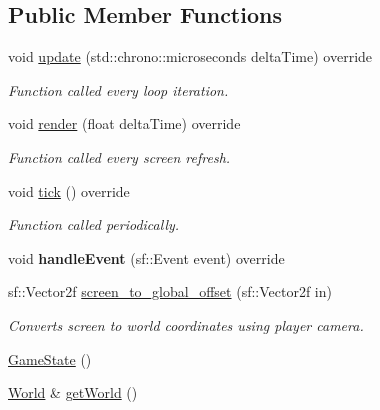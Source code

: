 \subsection*{Public Member Functions}
\begin{DoxyCompactItemize}
\item 
void \hyperlink{classGameState_aba059d7ab1a53b8f5d795292ed37abac}{update} (std\-::chrono\-::microseconds delta\-Time) override
\begin{DoxyCompactList}\small\item\em Function called every loop iteration. \end{DoxyCompactList}\item 
void \hyperlink{classGameState_aa4061260f4ca0acc7d1833dbb6691f0f}{render} (float delta\-Time) override
\begin{DoxyCompactList}\small\item\em Function called every screen refresh. \end{DoxyCompactList}\item 
void \hyperlink{classGameState_ae9ff24d75f36ef56daa6a180d4b38a09}{tick} () override
\begin{DoxyCompactList}\small\item\em Function called periodically. \end{DoxyCompactList}\item 
\hypertarget{classGameState_a092b43966ce6ccab5e55bf3854bf4180}{void {\bfseries handle\-Event} (sf\-::\-Event event) override}\label{classGameState_a092b43966ce6ccab5e55bf3854bf4180}

\item 
\hypertarget{classGameState_a945e9dfe15e3708799977ed8133f7678}{sf\-::\-Vector2f \hyperlink{classGameState_a945e9dfe15e3708799977ed8133f7678}{screen\-\_\-to\-\_\-global\-\_\-offset} (sf\-::\-Vector2f in)}\label{classGameState_a945e9dfe15e3708799977ed8133f7678}

\begin{DoxyCompactList}\small\item\em Converts screen to world coordinates using player camera. \end{DoxyCompactList}\item 
\hyperlink{classGameState_a4fa0a2bf50315c4a35a3890a0adcee5c}{Game\-State} ()
\item 
\hypertarget{classGameState_aebc076f9bcec0aa4317eff9e9a8d566e}{\hyperlink{classWorld}{World} \& \hyperlink{classGameState_aebc076f9bcec0aa4317eff9e9a8d566e}{get\-World} ()}\label{classGameState_aebc076f9bcec0aa4317eff9e9a8d566e}


\end{DoxyCompactItemize}
